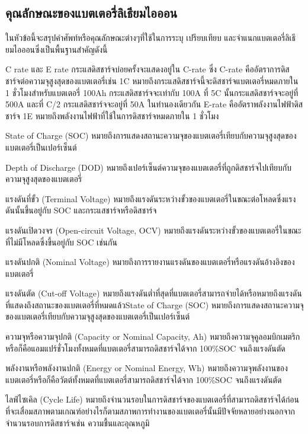 \subsection{คุณลักษณะของแบตเตอรี่ลิเธียมไอออน}
ในหัวข้อนี้จะสรุปคำศัพท์หรือคุณลักษณะต่างๆที่ใช้ในการระบุ เปรียบเทียบ และจำแนกแบตเตอรี่ลิเธียมไอออนซึ่งเป็นพื้นฐานสำคัญดังนี้
\begin{itemize}
	{\item
		C rate และ E rate กระแสดิสชาร์จบ่อยครั้งจะแสดงอยู่ใน C-rate ซึ่ง C-rate คืออัตราการดิสชาร์จต่อความจุสูงสุดของแบตเตอรี่เช่น 1C หมายถึงกระแสดิสชาร์จนี้จะดิสชาร์จแบตเตอรี่หมดภายใน 1 ชั่วโมงสำหรับแบตเตอรี่ 100Ah กระแสดิสชาร์จจะเท่ากับ 100A ที่ 5C นั้นกระแสดิสชาร์จจะอยู่ที่ 500A และที่ C/2 กระแสดิสชาร์จจะอยู่ที่ 50A ในทำนองเดียวกัน E-rate คืออัตราพลังงานไฟฟ้าดิสชาร์จ 1E หมายถึงพลังงานไฟฟ้าที่ใช้ในการดิสชาร์จหมดภายใน 1 ชั่วโมง}
	{\item
		State of Charge (SOC) หมายถึงการแสดงสถานะความจุของแบตเตอรี่เทียบกับความจุสูงสุดของแบตเตอรี่เป็นเปอร์เซ็นต์}
	{\item
		Depth of Discharge (DOD) หมายถึงเปอร์เซ็นต์ความจุของแบตเตอรี่ที่ถูกดิสชาร์จไปเทียบกับความจุสูงสุดของแบตเตอรี่}
	{\item
		แรงดันที่ขั้ว (Terminal Voltage) หมายถึงแรงดันระหว่างขั้วของแบตเตอรี่ในขณะต่อโหลดซึ่งแรงดันนั้นขึ้นอยู่กับ SOC และกระแสชาร์จหรือดิสชาร์จ}
	{\item
		แรงดันเปิดวงจร (Open-circuit Voltage, OCV) หมายถึงแรงดันระหว่างขั้วของแบตเตอรี่ในขณะที่ไม่มีโหลดซึ่งขึ้นอยู่กับ SOC เช่นกัน}
	{\item
		แรงดันปกติ (Nominal Voltage) หมายถึงการรายงานแรงดันของแบตเตอรี่หรือแรงดันอ้างอิงของแบตเตอรี่}
	{\item
		แรงดันตัด (Cut-off Voltage) หมายถึงแรงดันต่ำที่สุดที่แบตเตอรี่สามารถจ่ายได้หรือหมายถึงแรงดันที่แสดงถึงสถานะของแบตเตอรี่ที่หมดแล้วState of Charge (SOC) หมายถึงการแสดงสถานะความจุของแบตเตอรี่เทียบกับความจุสูงสุดของแบตเตอรี่เป็นเปอร์เซ็นต์}
	{\item
		ความจุหรือความจุปกติ (Capacity or Nominal Capacity, Ah) หมายถึงความจุคูลอมบิกเมตริกหรือก็คือแอมแปร์ชั่วโมงทั้งหมดที่แบตเตอรี่สามารถดิสชาร์จได้จาก 100\%SOC จนถึงแรงดันตัด}
	{\item
		พลังงานหรือพลังงานปกติ (Energy or Nominal Energy, Wh) หมายถึงความจุพลังงานของแบตเตอรี่หรือก็คือวัตต์ทั้งหมดที่แบตเตอรี่สามารถดิสชาร์จได้จาก 100\%SOC จนถึงแรงดันตัด}
	{\item
		ไลฟ์ไซเคิล (Cycle Life) หมายถึงจำนวนรอบในการดิสชาร์จของแบตเตอรี่ที่สามารถดิสชาร์จได้ก่อนที่จะเสื่อมสภาพตามเกณฑ์อย่างไรก็ตามสภาพการทำงานของแบตเตอรี่นั้นมีปัจจัยหลายอย่างนอกจากจำนวนรอบการดิสชาร์จเช่น ความชื้นและอุณหภูมิ}

\end{itemize}
